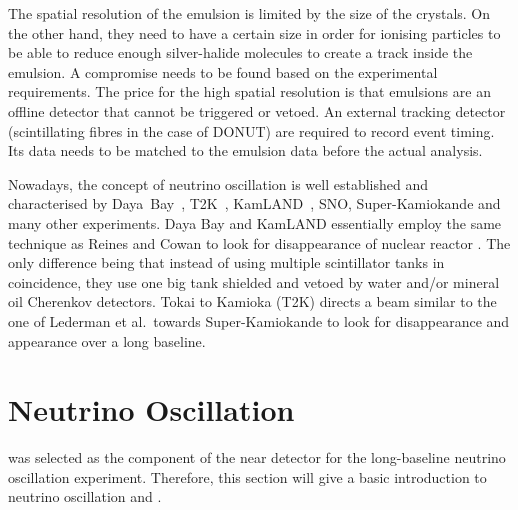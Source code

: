 The spatial resolution of the emulsion is limited by the size of the crystals.
On the other hand, they need to have a certain size in order for ionising particles to be able to reduce enough silver-halide molecules to create a track inside the emulsion.
A compromise needs to be found based on the experimental requirements.
The price for the high spatial resolution is that emulsions are an offline detector that cannot be triggered or vetoed.
An external tracking detector (scintillating fibres in the case of DONUT) are required to record event timing.
Its data needs to be matched to the emulsion data before the actual analysis.

Nowadays, the concept of neutrino oscillation is well established and characterised by Daya~Bay~\cite{dayabayRecent}, T2K~\cite{t2kOsc}, KamLAND~\cite{kamland}, SNO, Super-Kamiokande and many other experiments.
Daya Bay and KamLAND essentially employ the same technique as Reines and Cowan to look for disappearance of nuclear reactor \Pagne.
The only difference being that instead of using multiple scintillator tanks in coincidence, they use one big tank shielded and vetoed by water and/or mineral oil Cherenkov detectors.
Tokai to Kamioka (T2K) directs a \Pgngm beam similar to the one of Lederman et al.\ towards Super-Kamiokande to look for \Pgngm disappearance and \Pgne appearance over a long baseline.


\section{Neutrino Oscillation}
\label{sec:nu-detection_osc}


\AC{} was selected as the \lar{} component of the near detector for the \dune{} long-baseline neutrino oscillation experiment.
Therefore, this section will give a basic introduction to neutrino oscillation and \dune{}.

